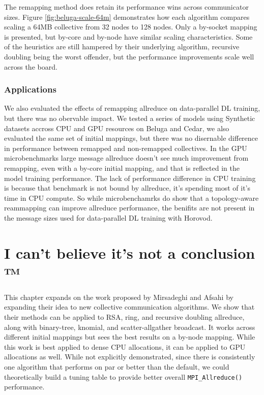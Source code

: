The remapping method does retain its performance wins across communicator sizes. 
Figure \ref{fig:beluga-scale-64m} demonstrates how each algorithm compares scaling a 64MB collective from 32 nodes to 128 nodes.
Only a by-socket mapping is presented, but by-core and by-node have similar scaling characteristics.
Some of the heuristics are still hampered by their underlying algorithm, recursive doubling being the worst offender, but the performance improvements scale well across the board.

\subsubsection{Applications}

We also evaluated the effects of remapping allreduce on data-parallel DL training, but there was no obervable impact.
We tested a series of models using Synthetic datasets accross CPU and GPU resources on Beluga and Cedar, we also evaluated the same set of initial mappings, but there was no disernable difference in performance between remapped and non-remapped collectives.
In the GPU microbenchmarks large message allreduce doesn't see much improvement from remapping, even with a by-core initial mapping, and that is reflected in the model training performance.
The lack of performance difference in CPU training is because that benchmark is not bound by allreduce, it's spending most of it's time in CPU compute.
So while microbenchamrks do show that a topology-aware reammapping can improve allreduce performance, the benifits are not present in the message sizes used for data-parallel DL training with Horovod.

\section{I can't believe it's not a conclusion ™}
This chapter expands on the work proposed by Mirsadeghi and Afsahi \cite{Mirsadeghi2016TopoAwareCollRR} by expanding their idea to new collective communication algorithms.
We show that their methods can be applied to RSA, ring, and recursive doubling allreduce, along with binary-tree, knomial, and scatter-allgather broadcast.
It works across different initial mappings but sees the best results on a by-node mapping.
While this work is best applied to dense CPU allocations, it can be applied to GPU allocations as well. 
While not explicitly demonstrated, since there is consistently one algorithm that performs on par or better than the default, we could theoretically build a tuning table to provide better overall \texttt{MPI\_Allreduce()} performance. 

